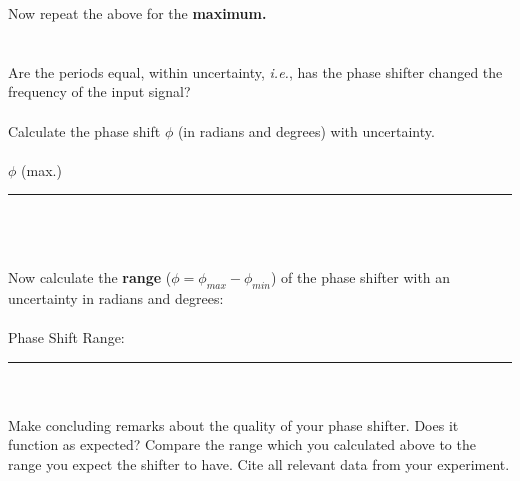 \noindent Now repeat the above for the {\bf maximum.} 
\ \\
\ \\
\ \\
\noindent Are the periods
equal, within uncertainty, {\it i.e.}, has the phase shifter changed the
frequency of the input signal? \\
\vspace*{3cm}
\\
\noindent Calculate the phase shift $\phi$ (in radians and degrees) with 
uncertainty.\\
\vspace*{3cm}\\
$\phi$ (max.) \rule{3cm}{.1mm} \\ 
\ \\
\pagebreak\\
\noindent Now calculate the {\bf range} ($\phi=\phi_{max}-\phi_{min}$) of the
phase shifter with an uncertainty in radians and degrees: \\
\vspace*{2cm}\\
Phase Shift Range: \rule{3cm}{.1mm} \\
\ \\
\noindent Make concluding remarks about the quality of your phase shifter. Does
it function as expected? Compare the range which you calculated above to the
range you expect the shifter to have. Cite all relevant data from your
experiment.

\vfill
{}



\renewcommand{\thesection}{\thechapter.\arabic{section}}















